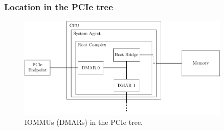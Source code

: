 \begin{frame}
    \frametitle{Location in the PCIe tree}

    \begin{figure}
        \centering
        \includegraphics[width=0.9\textwidth,clip]{figures/pcie-dmar.pdf}
        \caption{IOMMUs (DMARs) in the PCIe tree.}
    \end{figure}
\end{frame}

